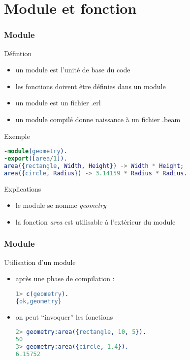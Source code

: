 \section{Module et fonction}

\begin{frame}[fragile]
  \frametitle{Module}

  \begin{block}{Défintion}
    \begin{itemize}
    \item un module est l'unité de base du code
    \item les fonctions doivent être définies dans un module
    \item un module est un fichier .erl
    \item un module compilé donne naissance à un fichier .beam
    \end{itemize}
  \end{block}

  \begin{exampleblock}{Exemple}
    \begin{lstlisting}[language=erlang]
-module(geometry).
-export([area/1]).
area({rectangle, Width, Height}) -> Width * Height;
area({circle, Radius}) -> 3.14159 * Radius * Radius.
    \end{lstlisting}
  \end{exampleblock}

  \begin{alertblock}{Explications}
    \begin{itemize}
    \item le module se nomme \textit{geometry}
    \item la fonction \textit{area} est utilisable à l'extérieur du module
    \end{itemize}
  \end{alertblock}

\end{frame}

\begin{frame}[fragile]
  \frametitle{Module}

  \begin{block}{Utilisation d'un module}
    \begin{itemize}
    \item après une phase de compilation :
      \begin{lstlisting}[language=erlang]
1> c(geometry).
{ok,geometry}
      \end{lstlisting}
    \item on peut ``invoquer'' les fonctions
      \begin{lstlisting}[language=erlang]
2> geometry:area({rectangle, 10, 5}).
50
3> geometry:area({circle, 1.4}).
6.15752
      \end{lstlisting}
    \end{itemize}
  \end{block}

\end{frame}

